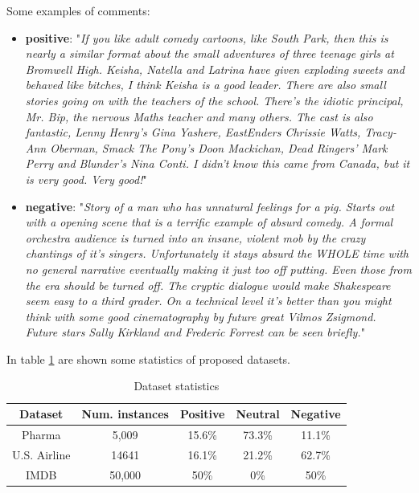 Some examples of comments:
\begin{itemize}
	\item \textbf{positive}: "\textit{If you like adult comedy cartoons, like South Park, then this is nearly a similar format about the small adventures of three teenage girls at Bromwell High. Keisha, Natella and Latrina have given exploding sweets and behaved like bitches, I think Keisha is a good leader. There are also small stories going on with the teachers of the school. There's the idiotic principal, Mr. Bip, the nervous Maths teacher and many others. The cast is also fantastic, Lenny Henry's Gina Yashere, EastEnders Chrissie Watts, Tracy-Ann Oberman, Smack The Pony's Doon Mackichan, Dead Ringers' Mark Perry and Blunder's Nina Conti. I didn't know this came from Canada, but it is very good. Very good!}"
	\item \textbf{negative}: "\textit{Story of a man who has unnatural feelings for a pig. Starts out with a opening scene that is a terrific example of absurd comedy. A formal orchestra audience is turned into an insane, violent mob by the crazy chantings of it's singers. Unfortunately it stays absurd the WHOLE time with no general narrative eventually making it just too off putting. Even those from the era should be turned off. The cryptic dialogue would make Shakespeare seem easy to a third grader. On a technical level it's better than you might think with some good cinematography by future great Vilmos Zsigmond. Future stars Sally Kirkland and Frederic Forrest can be seen briefly.}"
\end{itemize}



\vspace{1cm}
In table \ref{table:dataset_statistics} are shown some statistics of proposed datasets.


\begin{table}[ht]
	\centering    
	\begin{tabular}{ | c | c | c | c | c | }
		\hline
		Dataset & Num. instances & Positive & Neutral & Negative\\ 
		\hline
		Pharma & 5,009 & 15.6\% & 73.3\% & 11.1\% \\
		U.S. Airline & 14641 & 16.1\% & 21.2\% & 62.7\% \\
		IMDB & 50,000 & 50\% & 0\% & 50\% \\
		\hline
	\end{tabular}
	\captionsetup{justification=centering}
	\caption{Dataset statistics}
	\label{table:dataset_statistics}
\end{table}

